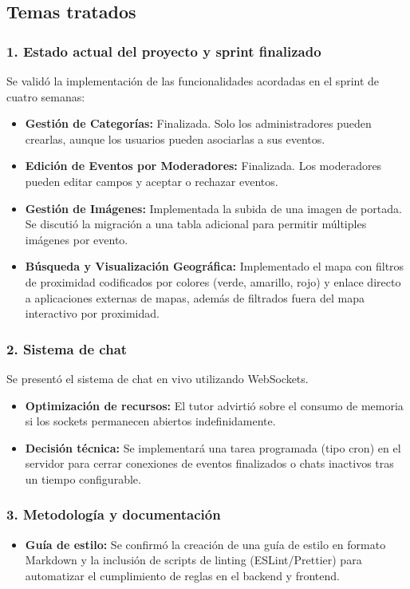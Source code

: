\subsection*{Temas tratados}

\subsubsection*{1. Estado actual del proyecto y sprint finalizado}
Se validó la implementación de las funcionalidades acordadas en el sprint de cuatro semanas:

\begin{itemize}
    \item \textbf{Gestión de Categorías:} Finalizada. Solo los administradores pueden crearlas, aunque los usuarios pueden asociarlas a sus eventos.
    \item \textbf{Edición de Eventos por Moderadores:} Finalizada. Los moderadores pueden editar campos y aceptar o rechazar eventos.
    \item \textbf{Gestión de Imágenes:} Implementada la subida de una imagen de portada. Se discutió la migración a una tabla adicional para permitir múltiples imágenes por evento.
    \item \textbf{Búsqueda y Visualización Geográfica:} Implementado el mapa con filtros de proximidad codificados por colores (verde, amarillo, rojo) y enlace directo a aplicaciones externas de mapas, además de filtrados fuera del mapa interactivo por proximidad.
\end{itemize}

\subsubsection*{2. Sistema de chat}
Se presentó el sistema de chat en vivo utilizando WebSockets.

\begin{itemize}
    \item \textbf{Optimización de recursos:} El tutor advirtió sobre el consumo de memoria si los sockets permanecen abiertos indefinidamente.
    \item \textbf{Decisión técnica:} Se implementará una tarea programada (tipo cron) en el servidor para cerrar conexiones de eventos finalizados o chats inactivos tras un tiempo configurable.
\end{itemize}

\subsubsection*{3. Metodología y documentación}
\begin{itemize}
    \item \textbf{Guía de estilo:} Se confirmó la creación de una guía de estilo en formato Markdown y la inclusión de scripts de linting (ESLint/Prettier) para automatizar el cumplimiento de reglas en el backend y frontend.
\end{itemize}

